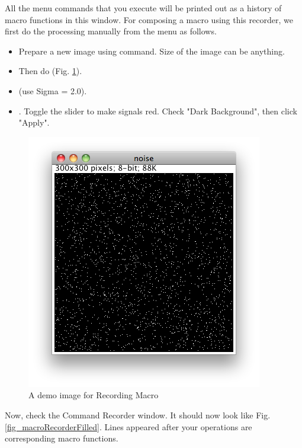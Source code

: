 All the menu commands that you execute will be printed out as a history of macro functions in this window. For composing a macro using this recorder, we first do the processing manually from the menu as follows. 
\begin{itemize}
  \item Prepare a new image using  command. Size of the image can be anything.
  \item Then do  (Fig.
  \ref{fig_SaltAndPepper}).
  \item {} (use Sigma = 2.0).
  \item {}. Toggle the slider to make
  signals red. Check "Dark Background", then click "Apply".
\end{itemize}
 
\begin{figure}[htbp]
\begin{center}
\includegraphics[scale=0.6]{fig/SaltandPepper300.png}
\caption{A demo image for Recording Macro} 
\label{fig_SaltAndPepper}
\end{center}
\end{figure}

Now, check the Command Recorder window. 
It should now look like Fig. \ref{fig_macroRecorderFilled}. 
Lines appeared after your operations are corresponding macro functions.

